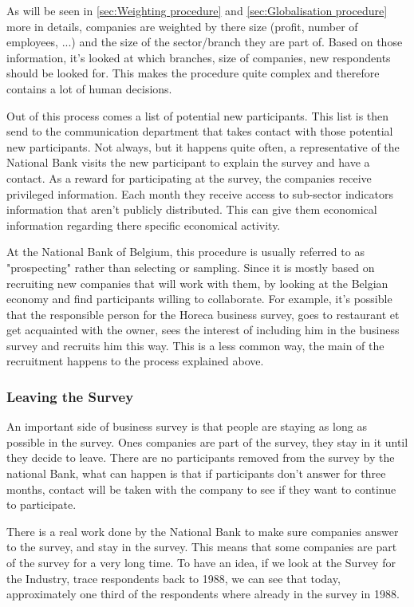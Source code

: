 \documentclass[12pt,a4paper,oneside]{book}
\begin{document}
As will be seen in \autoref{sec:Weighting procedure} and \autoref{sec:Globalisation procedure} more in details, companies are weighted by there size (profit, number of employees, ...) and the size of the sector/branch they are part of. 
Based on those information, it's looked at which branches, size of companies, new respondents should be looked for. 
This makes the procedure quite complex and therefore contains a lot of human decisions.
 
Out of this process comes a list of potential new participants. This list is then send to the communication department that takes  contact with those potential new participants. 
Not always, but it happens quite often, a representative of the National Bank visits the new participant to explain the survey and have a contact.
As a reward for participating at the survey, the companies receive privileged information. Each month they receive access to sub-sector indicators information that aren't publicly distributed. This can give them economical information regarding there specific economical activity.

At the National Bank of Belgium, this procedure is usually referred to as "prospecting" rather than selecting or sampling. Since it is mostly based on recruiting new companies that will work with them, by looking at the Belgian economy and find participants willing to collaborate. For example, it's possible that the responsible person for the Horeca business survey, goes to  restaurant et get acquainted with the owner, sees the interest of including him in the business survey and recruits him this way. This is a less common way, the main of the recruitment happens to the process explained above.


\subsubsection{Leaving the Survey}

An important side of business survey is that people are staying as long as possible in the survey.
Ones  companies are part of the survey, they stay in it until they decide to leave. There are no participants removed from the survey by the national Bank, what can happen is that if participants don't answer for three months, contact will be taken with the company to see if they want to continue to participate.

There is a real work done by the National Bank to make sure companies answer to the survey, and stay in the survey.
This means that some companies are part of the survey for a very long time.
To have an idea, if we look at the Survey for the Industry, trace respondents back to 1988, we can see that today, approximately one third of the respondents where already in the survey in 1988. 
\end{document}
